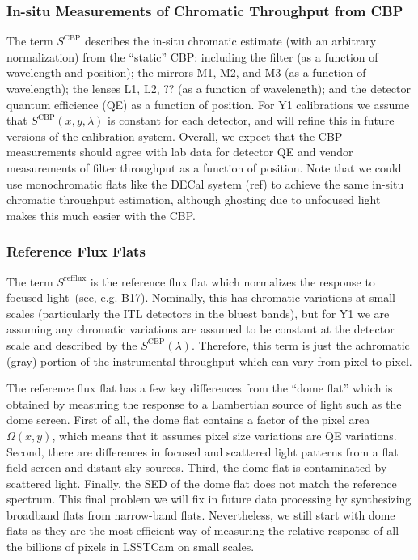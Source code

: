 \documentclass[SE,authoryear,lsstdraft,toc]{lsstdoc}
\begin{document}
\subsubsection{In-situ Measurements of Chromatic Throughput from CBP}

The term $S^{\mathrm{CBP}}$ describes the in-situ chromatic estimate (with an
arbitrary normalization) from the ``static'' CBP: including the filter (as a
function of wavelength and position); the mirrors M1, M2, and M3 (as a function
of wavelength); the lenses L1, L2, ?? (as a function of wavelength); and the
detector quantum efficience (QE) as a function of position.  For Y1
calibrations we assume that $S^{\mathrm{CBP}}(x, y, \lambda)$ is constant for each
detector, and will refine this in future versions of the calibration system.
Overall, we expect that the CBP measurements should agree with lab data for
detector QE and vendor measurements of filter throughput as a function of
position.  Note that we could use monochromatic flats like the DECal system
(ref) to achieve the same in-situ chromatic throughput estimation, although
ghosting due to unfocused light makes this much easier with the CBP.

\subsubsection{Reference Flux Flats}

The term $S^{\mathrm{refflux}}$ is the reference flux flat which normalizes the
response to focused light~(see, e.g. B17).  Nominally, this has chromatic
variations at small scales (particularly the ITL detectors in the bluest
bands), but for Y1 we are assuming any chromatic variations are assumed to be
constant at the detector scale and described by the
$S^{\mathrm{CBP}}(\lambda)$.  Therefore, this term is just the achromatic
(gray) portion of the instrumental throughput which can vary from pixel to
pixel.

The reference flux flat has a few key differences from the ``dome flat'' which
is obtained by measuring the response to a Lambertian source of light such as
the dome screen.  First of all, the dome flat contains a factor of the pixel
area $\Omega(x, y)$, which means that it assumes pixel size variations are QE
variations.  Second, there are differences in focused and scattered light
patterns from a flat field screen and distant sky sources.  Third, the dome
flat is contaminated by scattered light.  Finally, the SED of the dome flat
does not match the reference spectrum.  This final problem we will fix in
future data processing by synthesizing broadband flats from narrow-band flats.
Nevertheless, we still start with dome flats as they are the most efficient way
of measuring the relative response of all the billions of pixels in LSSTCam on
small scales.
\end{document}

